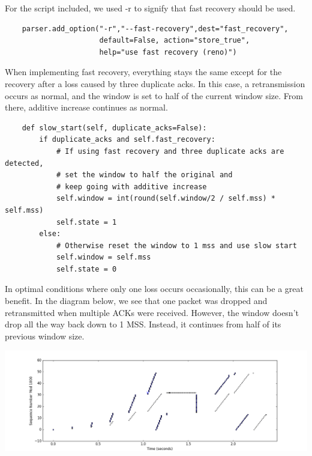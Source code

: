 \documentclass[11pt]{article}
\begin{document}
For the script included, we used -r to signify that fast recovery should be used.

\vspace{5mm}

\begin{lstlisting}
    parser.add_option("-r","--fast-recovery",dest="fast_recovery",
                      default=False, action="store_true",
                      help="use fast recovery (reno)")
\end{lstlisting}

\vspace{5mm}

When implementing fast recovery, everything stays the same except for the recovery after a loss caused by three duplicate acks. In this case, a retransmission occurs as normal, and the window is set to half of the current window size. From there, additive increase continues as normal. 

\vspace{5mm}

\begin{lstlisting}
    def slow_start(self, duplicate_acks=False):
        if duplicate_acks and self.fast_recovery:
            # If using fast recovery and three duplicate acks are detected,
            # set the window to half the original and 
            # keep going with additive increase
            self.window = int(round(self.window/2 / self.mss) * self.mss)
            self.state = 1
        else:
            # Otherwise reset the window to 1 mss and use slow start
            self.window = self.mss
            self.state = 0
\end{lstlisting}

\vspace{5mm}

In optimal conditions where only one loss occurs occasionally, this can be a great benefit. In the diagram below, we see that one packet was dropped and retransmitted when multiple ACKs were received. However, the window doesn't drop all the way back down to 1 MSS. Instead, it continues from half of its previous window size.

\vspace{5mm}

\includegraphics[width=17cm]{charts/renosingle.png}
\end{document}
